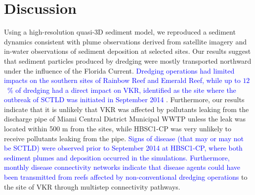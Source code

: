 \documentclass[preprint,12pt,authoryear]{elsarticle}
\newcommand{\modif}[1]{\textcolor{blue}{#1}}
\begin{document}
\section{Discussion}


Using a high-resolution quasi-3D sediment model, we reproduced a sediment dynamics consistent with plume observations derived from satellite imagery and in-water observations of sediment deposition at selected sites. Our results suggest that sediment particles produced by dredging were mostly transported northward under the influence of the Florida Current. \modif{Dredging operations had limited impacts on the southern sites of Rainbow Reef and Emerald Reef, while up to $12$~\% of dredging had a direct impact on VKR, identified as the site where the outbreak of SCTLD was initiated in September 2014 \citep{precht2016unprecedented}}. Furthermore, our results indicate that it is unlikely that VKR was affected by pollutants leaking from the discharge pipe of Miami Central District Municipal WWTP unless the leak was located within 500 m from the sites, while HBSC1-CP was very unlikely to receive pollutants leaking from the pipe. \modif{Signs of disease (that may or may not be SCTLD) were observed prior to September 2014 at HBSC1-CP, where both sediment plumes and deposition occurred in the simulations. Furthermore, monthly disease connectivity networks indicate that disease agents could have been transmitted from reefs affected by non-conventional dredging operations} to the site of VKR through multistep connectivity pathways.
\end{document}
